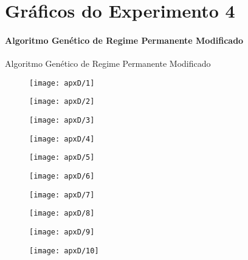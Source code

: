 
\chapter{Gráficos do Experimento 4}
\subsubsection{Algoritmo Genético de Regime Permanente Modificado}


Algoritmo Genético de Regime Permanente Modificado

\begin{figure}[H]
\centering

\texttt{[image: apxD/1]}

\end{figure}

\begin{figure}[H]
\centering

\texttt{[image: apxD/2]}

\end{figure}


\begin{figure}[H]
\centering

\texttt{[image: apxD/3]}

\end{figure}

\begin{figure}[H]
\centering

\texttt{[image: apxD/4]}

\end{figure}


\begin{figure}[H]
\centering

\texttt{[image: apxD/5]}

\end{figure}

\begin{figure}[H]
\centering

\texttt{[image: apxD/6]}

\end{figure}

\begin{figure}[H]
\centering

\texttt{[image: apxD/7]}

\end{figure}

\begin{figure}[H]
\centering

\texttt{[image: apxD/8]}

\end{figure}

\begin{figure}[H]
\centering

\texttt{[image: apxD/9]}

\end{figure}

\begin{figure}[H]
\centering

\texttt{[image: apxD/10]}

\end{figure}